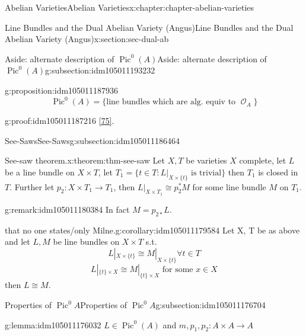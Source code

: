 \documentclass[oneside,10pt,]{book}
\numberwithin{equation}{section}
\newcommand{\sheaf}[1]{\operatorname{\mathcal{#1}}}
\DeclareMathOperator{\Pic}{Pic}
\begin{document}
\begin{chapterptx}{Abelian Varieties}{}{Abelian Varieties}{}{}{x:chapter:chapter-abelian-varieties}
\begin{sectionptx}{Line Bundles and the Dual Abelian Variety (Angus)}{}{Line Bundles and the Dual Abelian Variety (Angus)}{}{}{x:section:sec-dual-ab}
\begin{subsectionptx}{Aside: alternate description of \(\Pic^0(A)\)}{}{Aside: alternate description of \(\Pic^0(A)\)}{}{}{g:subsection:idm105011193232}
\begin{proposition}{}{}{g:proposition:idm105011187936}
%
\begin{equation*}
\Pic^0(A) = \{\text{line bundles which are alg. equiv to } \sheaf O_A\}
\end{equation*}
%
\end{proposition}
\begin{proofptx}{}{g:proof:idm105011187216}
\hyperlink{x:biblio:bib-polishchuck}{[75]}.%
\end{proofptx}
\end{subsectionptx}
%
%
\typeout{************************************************}
\typeout{************************************************}
%
\begin{subsectionptx}{See-Saws}{}{See-Saws}{}{}{g:subsection:idm105011186464}
\begin{theorem}{See-saw theorem.}{}{x:theorem:thm-see-saw}%
Let \(X,T\) be varieties      \(X\) complete, let \(L\) be a line bundle  on \(X\times T\), let \(T_1 = \{t\in T : L|_{X\times\{t\}} \text{ is trivial}\}\) then \(T_1\) is closed in \(T\). Further let \(p_2\colon X\times T_1 \to T_1\), then \(L|_{X\times T_1} \cong p^*_2 M\) for some line bundle \(M\) on \(T_1\).%
\end{theorem}
\begin{remark}{}{g:remark:idm105011180384}%
In fact \(M = p_{2*}L\).%
\end{remark}
\begin{corollary}{that no one states\slash{}only Milne.}{}{g:corollary:idm105011179584}%
Let X, T be as above and let \(L, M\) be line bundles on \(X\times T\) s.t.%
\begin{equation*}
L|_{X\times \{t\}} \cong M|_{X\times \{t\}} \forall t\in T
\end{equation*}
%
\begin{equation*}
L|_{\{t\}\times X} \cong M|_{\{t\}\times X} \text{ for some } x\in X
\end{equation*}
then \(L\cong M\).%
\end{corollary}
\end{subsectionptx}
%
%
\typeout{************************************************}
\typeout{Subsection 1.7.4 Properties of \(\Pic^0 A\)}
\typeout{************************************************}
%
\begin{subsectionptx}{Properties of \(\Pic^0 A\)}{}{Properties of \(\Pic^0 A\)}{}{}{g:subsection:idm105011176704}
\begin{lemma}{}{}{g:lemma:idm105011176032}%
\(L\in \Pic^0(A)\) and \(m,p_1,p_2\colon A\times A \to A\)%
\begin{enumerate}

\end{enumerate}
\end{lemma}
\end{subsectionptx}
\end{sectionptx}
\end{chapterptx}
\end{document}
